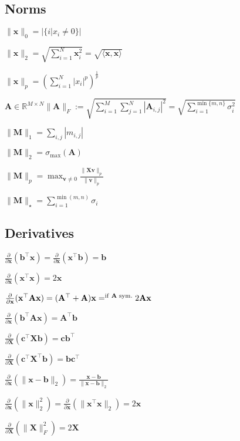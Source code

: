 \documentclass[a4paper, 11pt, landscape]{article}
\begin{document}
\begin{multicols*}{3}
\subsection{Norms}
\begin{inparaitem}[\color{red}\textbullet]
	\item $\|\mathbf{x}\|_0 = |\{i | x_i \neq 0\}|$
	\item $\|\mathbf{x}\|_2 = \sqrt{\sum_{i=1}^{N} \mathbf{x}_i^2} = \sqrt{\langle \mathbf{x}, \mathbf{x} \rangle}$
	\item $\|\mathbf{x}\|_p = \left( \sum_{i=1}^{N} |x_i|^p \right)^{\frac{1}{p}}$
	\item $\mathbf{A} \in \mathbb{R}^{M \times N}$$\|\mathbf{A}\|_F :=\allowbreak \sqrt{\sum_{i=1}^{M} \sum_{j=1}^{N} |\mathbf{A}_{i, j}|^2} =\allowbreak \sqrt{\sum_{i=1}^{\min\{m, n\}} \sigma_i^2}$
  \item $\|\mathbf{M}\|_1 = \sum_{i,j} | m_{i,j}|$
	\item $\|\mathbf{M}\|_2 = \sigma_{\text{max}}(\mathbf{A})$
	\item $\|\mathbf{M}\|_p = \max_{\mathbf{v} \neq 0} \frac{\|\mathbf{X}\mathbf{v}\|_p}{\|\mathbf{v}\|_p}$
	\item $\|\mathbf{M}\|_\star = \sum_{i=1}^{\min(m, n)} \sigma_i$
\end{inparaitem}

\subsection{Derivatives}
\begin{inparaitem}[\color{red}\textbullet]
  \item $\frac{\partial}{\partial \mathbf{x}}(\mathbf{b}^\top \mathbf{x}) = \frac{\partial}{\partial \mathbf{x}}(\mathbf{x}^\top \mathbf{b}) = \mathbf{b}$
  \item $\frac{\partial}{\partial \mathbf{x}}(\mathbf{x}^\top \mathbf{x}) = 2\mathbf{x}$
  \item $\frac{\partial}{\partial \mathbf{x}}(\mathbf{x}^\top \mathbf{A}\mathbf{x}) = (\mathbf{A}^\top + \mathbf{A})\mathbf{x} =^{\text{if \textbf{A} sym.}} 2\mathbf{A}\mathbf{x}$
  \item $\frac{\partial}{\partial \mathbf{x}}(\mathbf{b}^\top \mathbf{A}\mathbf{x}) = \mathbf{A}^\top \mathbf{b}$
  \item $\frac{\partial}{\partial \mathbf{X}}(\mathbf{c}^\top \mathbf{X} \mathbf{b}) = \mathbf{c}\mathbf{b}^\top$
  \item $\frac{\partial}{\partial \mathbf{X}}(\mathbf{c}^\top \mathbf{X}^\top \mathbf{b}) = \mathbf{b}\mathbf{c}^\top$
  \item $\frac{\partial}{\partial \mathbf{x}}(\| \mathbf{x}-\mathbf{b} \|_2) = \frac{\mathbf{x}-\mathbf{b}}{\|\mathbf{x}-\mathbf{b}\|_2}$
  \item $\frac{\partial}{\partial \mathbf{x}}(\|\mathbf{x}\|^2_2) = \frac{\partial}{\partial \mathbf{x}} (\|\mathbf{x}^\top \mathbf{x}\|_2) = 2\mathbf{x}$
  \item $\frac{\partial}{\partial \mathbf{X}}(\|\mathbf{X}\|_F^2) = 2\mathbf{X}$
\end{inparaitem}


\end{multicols*}
\end{document}
